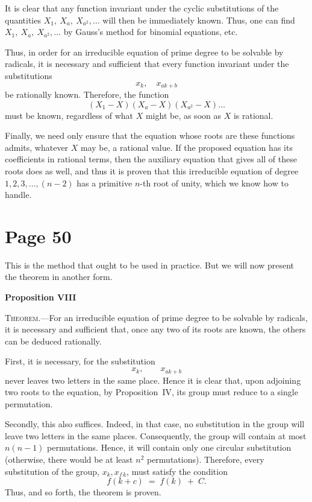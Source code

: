 \documentclass{article}
\begin{document}
It is clear that any function invariant under the cyclic substitutions of the quantities $X_1,\ X_a,\ X_{a^2},\dots$ will then be immediately known. Thus, one can find $X_1,\ X_a,\ X_{a^2},\dots$ by Gauss’s method for binomial equations, etc.

Thus, in order for an irreducible equation of prime degree to be solvable by radicals, it is necessary and sufficient that every function invariant under the substitutions
\[
x_k,\quad x_{a k + b}
\]
be rationally known. Therefore, the function
\[
(X_1 - X)(X_{a} - X)(X_{a^2} - X)\dots
\]
must be known, regardless of what $X$ might be, as soon as $X$ is rational.

Finally, we need only ensure that the equation whose roots are these functions admits, whatever $X$ may be, a rational value. If the proposed equation has its coefficients in rational terms, then the auxiliary equation that gives all of these roots does as well, and thus it is proven that this irreducible equation of degree $1,2,3,\dots,(n-2)$ has a primitive $n$-th root of unity, which we know how to handle.



\section*{Page 50}


This is the method that ought to be used in practice. But we will now present the theorem in another form.

\medskip
\noindent
\textbf{Proposition VIII}

\noindent
\textsc{Theorem.}---For an irreducible equation of prime degree to be solvable by radicals, it is necessary and sufficient that, once any two of its roots are known, the others can be deduced rationally.

\medskip
\noindent
First, it is necessary, for the substitution 
\[
x_{k}, \quad\quad x_{ak + b}
\]
never leaves two letters in the same place. Hence it is clear that, upon adjoining two roots to the equation, by Proposition~IV, its group must reduce to a single permutation.

\noindent
Secondly, this also suffices. Indeed, in that case, no substitution in the group will leave two letters in the same places. Consequently, the group will contain at most $n(n-1)$ permutations. Hence, it will contain only one circular substitution (otherwise, there would be at least $n^{2}$ permutations). Therefore, every substitution of the group, $x_{k}, x_{f\,k}$, must satisfy the condition
\[
f(k + c) \;=\; f(k) \;+\; C.
\]
Thus, and so forth, the theorem is proven.
\end{document}
